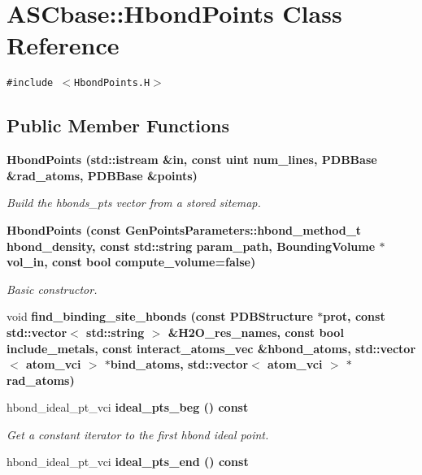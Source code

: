 \section{ASCbase::Hbond\-Points Class Reference}
\label{classASCbase_1_1HbondPoints}
{\tt \#include $<$Hbond\-Points.H$>$}

\subsection*{Public Member Functions}
\begin{CompactItemize}
\item 
\bf{Hbond\-Points} (std::istream \&in, const uint num\_\-lines, \bf{PDBBase} \&rad\_\-atoms, \bf{PDBBase} \&points)
\begin{CompactList}\small\item\em Build the hbonds\_\-pts vector from a stored sitemap. \item\end{CompactList}\item 
\bf{Hbond\-Points} (const \bf{Gen\-Points\-Parameters::hbond\_\-method\_\-t} hbond\_\-density, const std::string param\_\-path, \bf{Bounding\-Volume} $\ast$vol\_\-in, const bool compute\_\-volume=false)
\begin{CompactList}\small\item\em Basic constructor. \item\end{CompactList}\item 
void \bf{find\_\-binding\_\-site\_\-hbonds} (const \bf{PDBStructure} $\ast$prot, const std::vector$<$ std::string $>$ \&H2O\_\-res\_\-names, const bool include\_\-metals, const interact\_\-atoms\_\-vec \&hbond\_\-atoms, std::vector$<$ atom\_\-vci $>$ $\ast$bind\_\-atoms, std::vector$<$ atom\_\-vci $>$ $\ast$rad\_\-atoms)
\item 
hbond\_\-ideal\_\-pt\_\-vci \bf{ideal\_\-pts\_\-beg} () const \label{classASCbase_1_1HbondPoints_cfc90ecdc78a82f1fc2cd6a3894f71f5}

\begin{CompactList}\small\item\em Get a constant iterator to the first hbond ideal point. \item\end{CompactList}\item 
hbond\_\-ideal\_\-pt\_\-vci \bf{ideal\_\-pts\_\-end} () const \label{classASCbase_1_1HbondPoints_dbcd5aa42ce40703760fab5195f15093}


\end{CompactItemize}

